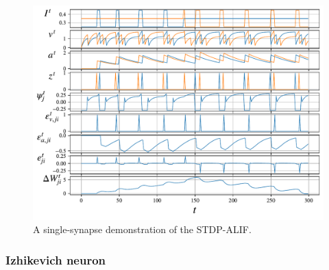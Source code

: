 	        \begin{figure}[ht]
	            \centering
	            \includegraphics[width=\linewidth]{gfx/stdpalif}
	            \caption{A single-synapse demonstration of the STDP-ALIF.}
	            \label{fig:stdpalif}
	        \end{figure}

		\subsubsection{Izhikevich neuron}\label{sec:izhikevich}


